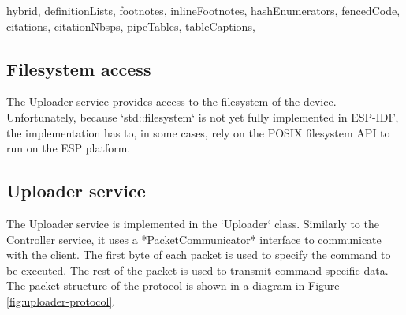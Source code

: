\begin{markdown*}{%
  hybrid,
  definitionLists,
  footnotes,
  inlineFootnotes,
  hashEnumerators,
  fencedCode,
  citations,
  citationNbsps,
  pipeTables,
  tableCaptions,
}
\subsection{Filesystem access}

The Uploader service provides access to the filesystem of the device. Unfortunately, because `std::filesystem` is not yet fully implemented in ESP-IDF, the implementation has to, in some cases, rely on the POSIX filesystem API to run on the ESP platform.

\subsection{Uploader service}

The Uploader service is implemented in the `Uploader` class. Similarly to the Controller service, it uses a *PacketCommunicator* interface to communicate with the client. The first byte of each packet is used to specify the command to be executed. The rest of the packet is used to transmit command-specific data. The packet structure of the protocol is shown in a diagram in Figure \ref{fig:uploader-protocol}.


\end{markdown*}
